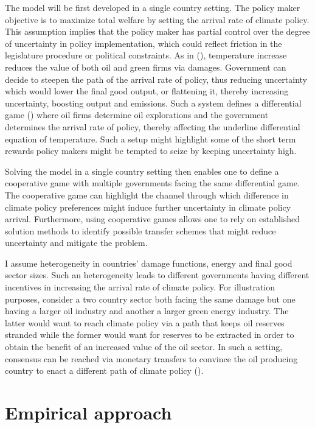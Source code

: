 \documentclass[american]{scrartcl}
\newcommand{\citein}[1]{\citeauthor{#1} (\citeyear{#1})}
\begin{document}
The model will be first developed in a single country setting. The policy maker objective is to maximize total welfare by setting the arrival rate of climate policy. This assumption implies that the policy maker has partial control over the degree of uncertainty in policy implementation, which could reflect friction in the legislature procedure or political constraints. As in \citein{Barnett2019}, temperature increase reduces the value of both oil and green firms via damages. Government can decide to steepen the path of the arrival rate of policy, thus reducing uncertainty which would lower the final good output, or flattening it, thereby increasing uncertainty, boosting output and emissions. Such a system defines a differential game (\cite{Clemhout1979}) where oil firms determine oil explorations and the government determines the arrival rate of policy, thereby affecting the underline differential equation of temperature. Such a setup might highlight some of the short term rewards policy makers might be tempted to seize by keeping uncertainty high.

Solving the model in a single country setting then enables one to define a cooperative game with multiple governments facing the same differential game. The cooperative game can highlight the channel through which difference in climate policy preferences might induce further uncertainty in climate policy arrival. Furthermore, using cooperative games allows one to rely on established solution methods to identify possible transfer schemes that might reduce uncertainty and mitigate the problem.

I assume heterogeneity in countries' damage functions, energy and final good sector sizes. Such an heterogeneity leads to different governments having different incentives in increasing the arrival rate of climate policy. For illustration purposes, consider a two country sector both facing the same damage but one having a larger oil industry and another a larger green energy industry. The latter would want to reach climate policy via a path that keeps oil reserves stranded while the former would want for reserves to be extracted in order to obtain the benefit of an increased value of the oil sector. In such a setting, consensus can be reached via monetary transfers to convince the oil producing country to enact a different path of climate policy (\cite{Ju2006}).

\section{Empirical approach}
\end{document}
